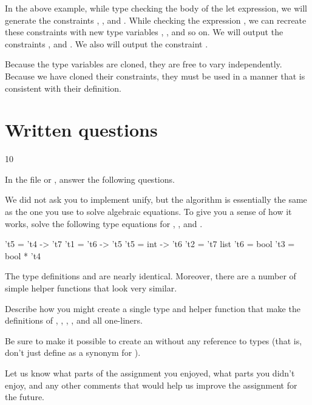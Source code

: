 \documentclass{pset}
\begin{document}
In the above example, while type checking the body of the let expression, we
will generate the constraints , , and
.  While checking the expression , we can
recreate these constraints with new type variables , , and
so on.  We will output the constraints ,  and
.  We also will output the constraint .

Because the type variables are cloned, they are free to vary independently.
Because we have cloned their constraints, they must be used in a manner that is
consistent with their definition.

\newpage{}
\part{Written questions}{10}
\label{part:written}

In the file  or , answer the
following questions.

We did not ask you to implement unify, but the algorithm is essentially the
same as the one you use to solve algebraic equations.  To give you a sense of
how it works, solve the following type equations for , ,
and .

\begin{ocaml}
't5 = 't4 -> 't7              't1 = 't6 -> 't5
't5 = int -> 't6              't2 = 't7 list
't6 = bool                    't3 = bool * 't4
\end{ocaml}

The type definitions  and  are
nearly identical.  Moreover, there are a number of simple helper functions that
look very similar.

Describe how you might create a single type and helper function that make the
definitions of , , ,
, and  all one-liners.

Be sure to make it possible to create an  without any
reference to types (that is, don't just define  as a synonym for
).

Let us know what parts of the assignment you enjoyed, what parts you didn't
enjoy, and any other comments that would help us improve the assignment for the
future.
\end{document}
